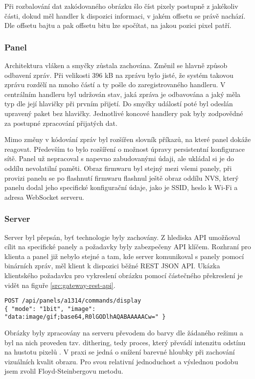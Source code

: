 Při rozbalování dat zakódovaného obrázku šlo číst pixely postupně z jakékoliv části, dokud měl handler k dispozici informaci, v jakém offsetu se právě nachází. Dle offsetu bajtu a pak offsetu bitu lze spočítat, na jakou pozici pixel patří.

\subsubsection{Panel}
Architektura vláken a smyčky zůstala zachována. Změnil se hlavně způsob odbavení zpráv. Při velikosti 396 kB na zprávu bylo jisté, že systém takovou zprávu rozdělí na mnoho částí a ty pošle do zaregistrovaného handleru. V centrálním handleru byl udržován stav, jaká zpráva je odbavována a jaký měla typ dle její hlavičky při prvním přijetí. Do smyčky událostí poté byl odeslán upravený paket bez hlavičky. Jednotlivé koncové handlery pak byly zodpovědné za postupné zpracování přijatých dat.

Mimo změny v kódování zpráv byl rozšířen slovník příkazů, na které panel dokáže reagovat. Především to bylo rozšíření o možnost úpravy persistentní konfigurace sítě. Panel už nepracoval s napevno zabudovanými údaji, ale ukládal si je do oddílu nevolatilní paměti. Obraz firmwaru byl stejný mezi všemi panely, při provizi panelu se po flashnutí firmwaru flashnul ještě obraz oddílu NVS, který panelu dodal jeho specifické konfigurační údaje, jako je SSID, heslo k Wi-Fi a adresa WebSocket serveru.

\subsubsection{Server}
Server byl přepsán, byť technologie byly zachovány. Z hlediska API umožňoval cílit na specifické panely a požadavky byly zabezpečeny API klíčem. Rozhraní pro klienta a panel již nebylo stejné a tam, kde server komunikoval s panely pomocí binárních zpráv, měl klient k dispozici běžné REST JSON API. Ukázka klientského požadavku pro vykreslení obrázku pomocí částečného překreslení je vidět na figuře \ref{src:gateway-rest-api}.

\begin{lstlisting}[label=src:gateway-rest-api,caption={Požadavek na server pro částečné překreslení obrázku ve verzi Birnárních zpráv}]
POST /api/panels/a1314/commands/display
{ "mode": "1bit", "image": "data:image/gif;base64,R0lGODlhAQABAAAAACw=" }
\end{lstlisting}

Obrázky byly zpracovány na serveru převodem do barvy dle žádaného režimu a byl na nich proveden tzv. dithering, tedy proces, který převádí intenzitu odstínu na hustotu pixelů \cite{Dithering}. V praxi se jedná o snížení barevné hloubky při zachování vizuálních kvalit obrazu. Pro svou relativní jednoduchost a výslednou podobu jsem zvolil Floyd-Steinbergovu metodu\cite{knuthDigitalHalftonesDot1987}\cite{hellandImageDitheringEleven2012}.

